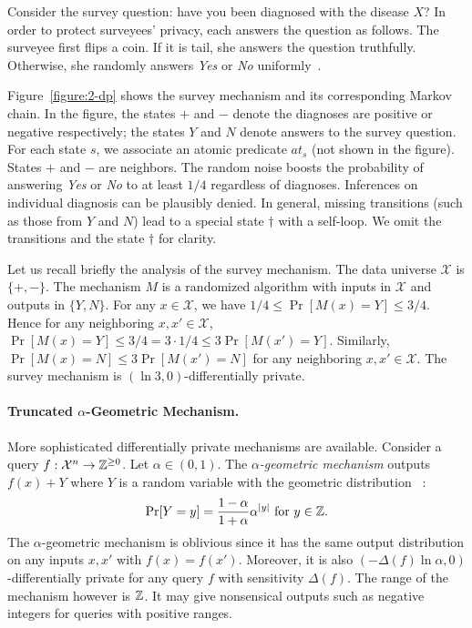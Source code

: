 Consider the survey question: have you been diagnosed
with the disease $X$? In order to protect surveyees' privacy, each
answers the question as follows. The surveyee first flips a
coin. If it is tail, she answers the question truthfully. Otherwise,
she randomly answers \textit{Yes} or \textit{No}
uniformly~\cite{DR:14:AFDP}.

\begin{example}\label{exa:survey}
  Figure~\ref{figure:2-dp} shows the survey
mechanism and its corresponding Markov chain. In the figure, the states
$+$ and $-$ denote the diagnoses are positive or negative
respectively; the states $Y$ and $N$ denote answers to the survey
question. For each state $s$, we associate an atomic predicate
$\mathit{at}_s$ (not shown in the figure).
States $+$ and $-$ are neighbors. 
The random noise boosts the probability of answering
\textit{Yes} or \textit{No} to at least $1/4$ regardless of
diagnoses. Inferences on individual diagnosis can be plausibly denied.
In general, missing transitions (such as those from $Y$ and $N$) lead
to a special state $\dagger$ with a self-loop. We omit the transitions
and the state $\dagger$ for clarity.
\end{example}

Let us recall briefly the analysis of the survey mechanism. The data universe
$\mathcal{X}$ is $\{ +, - \}$. The mechanism $M$ is a randomized
algorithm with inputs in $\mathcal{X}$ and outputs in $\{ Y, N
\}$. For any $x \in \mathcal{X}$, we have $1/4 \leq \Pr[M(x) = Y] \leq
3/4$. Hence for any neighboring $x, x' \in \mathcal{X}$, $\Pr[M(x) =
Y] \leq 3/4 = 3 \cdot 1/4 \leq 3 \Pr[M (x') =
Y]$. Similarly, $\Pr[M (x) = N] \leq 3 \Pr[M (x') = N]$ for any
neighboring $x, x' \in \mathcal{X}$. The survey mechanism is
$(\ln 3, 0)$-differentially private.

\paragraph{Truncated $\alpha$-Geometric Mechanism.}
More sophisticated differentially private mechanisms are
available. Consider a query
$f : \mathcal{X}^n \rightarrow \mathbb{Z}^{\geq 0}$. Let $\alpha \in (0, 1)$.
The \emph{$\alpha$-geometric mechanism}
outputs $f(x) + Y$ where $Y$ is a random variable with the geometric
distribution~\cite{GRS:09:UUPM,GRS:12:UUPM} :
\[
\Pr[Y = y] = \frac{1 - \alpha}{1 + \alpha}\alpha^{|y|}
\textmd{ for } y \in \mathbb{Z}.
\]
The $\alpha$-geometric mechanism is oblivious since it has the same
output distribution on any inputs $x, x'$ with $f (x) = f
(x')$. Moreover, it is also $(- {\Delta (f)} \ln \alpha, 0)$-differentially
private for any query $f$ with sensitivity $\Delta (f)$. The range of
the mechanism
however is $\mathbb{Z}$. It may give nonsensical outputs such as
negative integers for queries with positive ranges.


